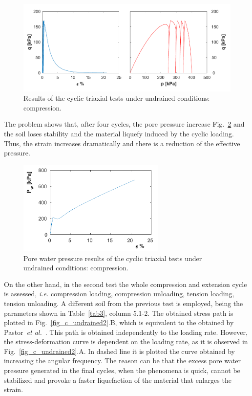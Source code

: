 \documentclass[preprint,12pt,a4paper]{elsarticle}
\begin{document}
\begin{figure}
\centering
\includegraphics[width=1.05\textwidth]{Figs/ciclo_undrained_1.pdf}
\caption{Results of the cyclic triaxial tests under undrained conditions: compression.}
\label{fig_c_undrained1}
\end{figure}

The problem shows that, after four cycles, the pore pressure increase Fig.~\ref{fig_c_undrainedpw} and the soil loses stability and the material liquefy induced by the cyclic loading. Thus, the strain increases dramatically and there is a reduction of the effective pressure. 

\begin{figure}
\centering
\includegraphics[width=0.65\textwidth]{Figs/ciclo_undrained_pw.pdf}
\caption{Pore water pressure results of the cyclic triaxial tests under undrained conditions: compression.}
\label{fig_c_undrainedpw}
\end{figure}


On the other hand, in the second test the whole compression and extension cycle is assessed, \textit{i.e.} compression loading, compression unloading, tension loading, tension unloading. A different soil from the previous test is employed, being the parameters shown in Table~\ref{tab3}, column 5.1-2. The obtained stress path  is plotted in Fig.~\ref{fig_c_undrained2}.B, which is equivalent to the obtained by Pastor~\textit{et al.}~\cite{PastorZC:90}.  This path is obtained independently to the loading rate. However, the stress-deformation curve is dependent on the loading rate, as it is observed in Fig.~\ref{fig_c_undrained2}.A. In dashed line it is plotted the curve obtained by increasing the angular frequency. The reason can be that the excess pore water pressure generated in the final cycles,  when the phenomena is quick, cannot be stabilized and provoke a faster liquefaction of the material that enlarges the strain.
\end{document}
